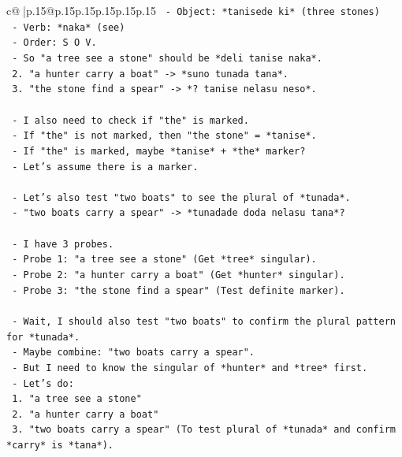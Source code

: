\documentclass{article}
\begin{document}
{\begin{supertabular}{c@{$\;$}|p{.15\linewidth}@{}p{.15\linewidth}p{.15\linewidth}p{.15\linewidth}p{.15\linewidth}p{.15\linewidth}}
{{{\texttt{         {-} Object: *tanisede ki* (three stones)} \\
\texttt{         {-} Verb: *naka* (see)} \\
\texttt{         {-} Order: S O V.} \\
\texttt{         {-} So "a tree see a stone" should be *deli tanise naka*.} \\
\texttt{      2. "a hunter carry a boat" {-}> *suno tunada tana*.} \\
\texttt{      3. "the stone find a spear" {-}> *? tanise nelasu neso*.} \\
\\ 
\texttt{    {-} I also need to check if "the" is marked.} \\
\texttt{    {-} If "the" is not marked, then "the stone" = *tanise*.} \\
\texttt{    {-} If "the" is marked, maybe *tanise* + *the* marker?} \\
\texttt{    {-} Let's assume there is a marker.} \\
\\ 
\texttt{    {-} Let's also test "two boats" to see the plural of *tunada*.} \\
\texttt{    {-} "two boats carry a spear" {-}> *tunadade doda nelasu tana*?} \\
\\ 
\texttt{    {-} I have 3 probes.} \\
\texttt{    {-} Probe 1: "a tree see a stone" (Get *tree* singular).} \\
\texttt{    {-} Probe 2: "a hunter carry a boat" (Get *hunter* singular).} \\
\texttt{    {-} Probe 3: "the stone find a spear" (Test definite marker).} \\
\\ 
\texttt{    {-} Wait, I should also test "two boats" to confirm the plural pattern for *tunada*.} \\
\texttt{    {-} Maybe combine: "two boats carry a spear".} \\
\texttt{    {-} But I need to know the singular of *hunter* and *tree* first.} \\
\texttt{    {-} Let's do:} \\
\texttt{      1. "a tree see a stone"} \\
\texttt{      2. "a hunter carry a boat"} \\
\texttt{      3. "two boats carry a spear" (To test plural of *tunada* and confirm *carry* is *tana*).} \\
}}}
\end{supertabular}}
\end{document}
